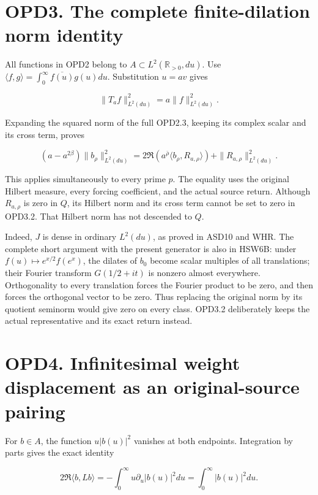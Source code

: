 \section{OPD3. The complete finite-dilation norm
identity}\label{opd3.-the-complete-finite-dilation-norm-identity}

All functions in OPD2 belong to \(A\subset L^2(\mathbb R_{>0},du)\). Use
\(\langle f,g\rangle=\int_0^\infty\overline{f(u)}g(u)du\). Substitution
\(u=av\) gives

\[
\|T_af\|_{L^2(du)}^2=a\|f\|_{L^2(du)}^2.
\tag{OPD3.1}
\]

Expanding the squared norm of the full OPD2.3, keeping its complex
scalar and its cross term, proves

\[
\boxed{
(a-a^{2\beta})\|b_\rho\|_{L^2(du)}^2
=2\Re\!\left(a^{\bar\rho}\langle b_\rho,R_{a,\rho}\rangle\right)
 +\|R_{a,\rho}\|_{L^2(du)}^2.}
\tag{OPD3.2}
\]

This applies simultaneously to every prime \(p\). The equality uses the
original Hilbert measure, every forcing coefficient, and the actual
source return. Although \(R_{a,\rho}\) is zero in \(Q\), its Hilbert
norm and its cross term cannot be set to zero in OPD3.2. That Hilbert
norm has not descended to \(Q\).

Indeed, \(J\) is dense in ordinary \(L^2(du)\), as proved in ASD10 and
WHR. The complete short argument with the present generator is also in
HSW6B: under \(f(u)\mapsto e^{x/2}f(e^x)\), the dilates of \(b_0\)
become scalar multiples of all translations; their Fourier transform
\(G(1/2+it)\) is nonzero almost everywhere. Orthogonality to every
translation forces the Fourier product to be zero, and then forces the
orthogonal vector to be zero. Thus replacing the original norm by its
quotient seminorm would give zero on every class. OPD3.2 deliberately
keeps the actual representative and its exact return instead.

\section{OPD4. Infinitesimal weight displacement as an original-source
pairing}\label{opd4.-infinitesimal-weight-displacement-as-an-original-source-pairing}

For \(b\in A\), the function \(u|b(u)|^2\) vanishes at both endpoints.
Integration by parts gives the exact identity

\[
2\Re\langle b,Lb\rangle
=-\int_0^\infty u\partial_u|b(u)|^2du
=\int_0^\infty|b(u)|^2du.
\tag{OPD4.1}
\]


